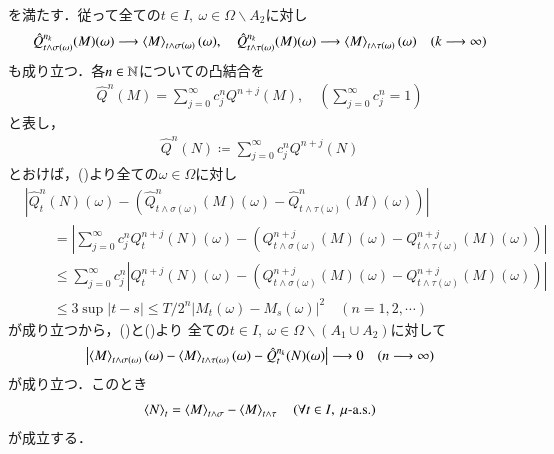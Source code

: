 \begin{prf}
\begin{description}
				を満たす．従って全ての$t \in I,\ \omega \in \Omega \backslash A_2$に対し
				\begin{align}
					\hat{Q}^{n_k}_{t\wedge\sigma(\omega)}(M)(\omega) \longrightarrow \inprod<M>_{t\wedge\sigma(\omega)}(\omega),
					\quad \hat{Q}^{n_k}_{t\wedge\tau(\omega)}(M)(\omega) \longrightarrow \inprod<M>_{t\wedge\tau(\omega)}(\omega) 
					\quad (k \longrightarrow \infty)
					\label{eq:stopped_quadratic_variation_6}
				\end{align}
				も成り立つ．各$n \in \mathbb{N}$についての凸結合を
				\begin{align}
					\hat{Q}^n(M) = \sum_{j=0}^{\infty} c_j^n Q^{n+j}(M),
					\quad \left( \sum_{j=0}^{\infty} c_j^n = 1 \right)
				\end{align}
				と表し，
				\begin{align}
					\hat{Q}^n(N) \coloneqq \sum_{j=0}^{\infty} c_j^n Q^{n+j}(N)
				\end{align}
				とおけば，()より全ての$\omega \in \Omega$に対し
				\begin{align}
					&\left| \hat{Q}^n_t(N)(\omega) - \left( \hat{Q}^n_{t\wedge\sigma(\omega)}(M)(\omega) - \hat{Q}^n_{t\wedge\tau(\omega)}(M)(\omega) \right) \right| \\
					&\qquad = \left| \sum_{j=0}^{\infty} c_j^n Q^{n+j}_t(N)(\omega) - \left( Q^{n+j}_{t\wedge\sigma(\omega)}(M)(\omega) - Q^{n+j}_{t\wedge\tau(\omega)}(M)(\omega) \right) \right| \\
					&\qquad \leq \sum_{j=0}^{\infty} c_j^n \left| Q^{n+j}_t(N)(\omega) - \left( Q^{n+j}_{t\wedge\sigma(\omega)}(M)(\omega) - Q^{n+j}_{t\wedge\tau(\omega)}(M)(\omega) \right) \right| \\
					&\qquad \leq 3 \sup{|t - s| \leq T/2^n}{|M_t(\omega) - M_s(\omega)|^2}
					\quad (n=1,2,\cdots)
				\end{align}
				が成り立つから，()と()より
				全ての$t \in I,\ \omega \in \Omega \backslash (A_1 \cup A_2)$に対して
				\begin{align}
					\left| \inprod<M>_{t\wedge\sigma(\omega)}(\omega) - \inprod<M>_{t\wedge\tau(\omega)}(\omega) - \hat{Q}^{n_k}_t(N)(\omega) \right|
					\longrightarrow 0 \quad (n \longrightarrow \infty)
				\end{align}
				が成り立つ．このとき
				\begin{align}
					\inprod<N>_t = \inprod<M>_{t\wedge\sigma} - \inprod<M>_{t\wedge\tau}
					\quad (\forall t \in I,\ \mbox{$\mu$-a.s.})
				\end{align}
				が成立する．
			

\end{description}
\end{prf}
